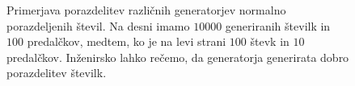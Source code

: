 \documentclass[slovene,11pt,a4paper]{article}
\numberwithin{equation}{section} %
\numberwithin{figure}{section} %
\numberwithin{table}{section} %
\begin{document}
\begin{figure}[!t]
\noindent{}
\caption{Primerjava porazdelitev različnih generatorjev normalno porazdeljenih števil. Na desni imamo $10000$ generiranih številk in $100$ predalčkov, medtem, ko je na levi strani $100$ števk in $10$ predalčkov. Inženirsko lahko rečemo, da generatorja generirata dobro porazdelitev številk.}
\end{figure}
\end{document}
